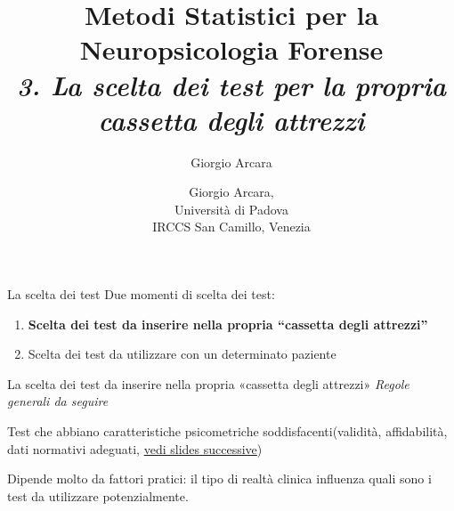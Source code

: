 \documentclass[
  ignorenonframetext,
]{beamer}
\author{Giorgio Arcara}
\date{}
\begin{document}
\begin{frame}
\title{Metodi Statistici per la Neuropsicologia Forense\\ \vspace{1em} \emph{3. La scelta dei test per la propria cassetta degli attrezzi}}
\author{Giorgio Arcara,\\ Università di Padova \\ IRCCS San Camillo, Venezia}

\maketitle
\end{frame}

\begin{frame}{La scelta dei test}
\label{la-scelta-dei-test}
Due momenti di scelta dei test:

\begin{enumerate}[<+->]
[1)]
\item
  \textbf{Scelta dei test da inserire nella propria ``cassetta degli
  attrezzi''}
\item
  Scelta dei test da utilizzare con un determinato paziente
\end{enumerate}
\end{frame}

\begin{frame}{La scelta dei test da inserire nella propria «cassetta
degli attrezzi»}
\label{la-scelta-dei-test-da-inserire-nella-propria-cassetta-degli-attrezzi}
\emph{Regole generali da seguire}

Test che abbiano caratteristiche psicometriche soddisfacenti(validità,
affidabilità, dati normativi adeguati,
\underline{vedi slides successive})

Dipende molto da fattori pratici: il tipo di realtà clinica influenza
quali sono i test da utilizzare potenzialmente.
\end{frame}
\end{document}
